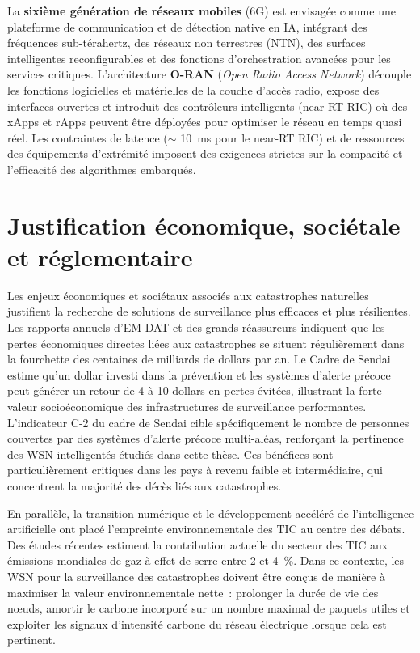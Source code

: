 La \textbf{sixième génération de réseaux mobiles} (6G) est envisagée comme une plateforme de communication et de détection native en IA, intégrant des fréquences sub-térahertz, des réseaux non terrestres (NTN), des surfaces intelligentes reconfigurables et des fonctions d'orchestration avancées pour les services critiques\cite{saad2020vision6g,amatetti2024ntn,abualigah_swarm_2023}. L'architecture \textbf{O-RAN} (\emph{Open Radio Access Network}) découple les fonctions logicielles et matérielles de la couche d'accès radio, expose des interfaces ouvertes et introduit des contrôleurs intelligents (near-RT RIC) où des xApps et rApps peuvent être déployées pour optimiser le réseau en temps quasi réel\cite{polese2023oran,oran_official_architecture,oran_survey_acm2024}. Les contraintes de latence ($\sim$ 10~ms pour le near-RT RIC) et de ressources des équipements d'extrémité imposent des exigences strictes sur la compacité et l'efficacité des algorithmes embarqués\cite{dasilva2024xapp,demichelis2025edge,demirel2026agentic}.

\section{Justification économique, sociétale et réglementaire}\label{sec:intro-justification}

Les enjeux économiques et sociétaux associés aux catastrophes naturelles justifient la recherche de solutions de surveillance plus efficaces et plus résilientes. Les rapports annuels d'EM-DAT et des grands réassureurs indiquent que les pertes économiques directes liées aux catastrophes se situent régulièrement dans la fourchette des centaines de milliards de dollars par an\cite{undrr2020,burgueno_salas_global_nodate,swiss_re_2025}. Le Cadre de Sendai estime qu'un dollar investi dans la prévention et les systèmes d'alerte précoce peut générer un retour de 4 à 10 dollars en pertes évitées, illustrant la forte valeur socioéconomique des infrastructures de surveillance performantes\cite{UNDRR2015Sendai}. L'indicateur C-2 du cadre de Sendai cible spécifiquement le nombre de personnes couvertes par des systèmes d'alerte précoce multi-aléas, renforçant la pertinence des WSN intelligentés étudiés dans cette thèse\cite{UNDRR2015Sendai,wmo2025climate}. Ces bénéfices sont particulièrement critiques dans les pays à revenu faible et intermédiaire, qui concentrent la majorité des décès liés aux catastrophes\cite{undrr2020,wmo2025climate}.

En parallèle, la transition numérique et le développement accéléré de l'intelligence artificielle ont placé l'empreinte environnementale des TIC au centre des débats. Des études récentes estiment la contribution actuelle du secteur des TIC aux émissions mondiales de gaz à effet de serre entre 2 et 4~\%\cite{freitag2021ict,andrae2021real_climate}. Dans ce contexte, les WSN pour la surveillance des catastrophes doivent être conçus de manière à maximiser la valeur environnementale nette~: prolonger la durée de vie des nœuds, amortir le carbone incorporé sur un nombre maximal de paquets utiles et exploiter les signaux d'intensité carbone du réseau électrique lorsque cela est pertinent\cite{pirson2021embodied,aioti2024carbon,carbon_signals_acm2025}.

